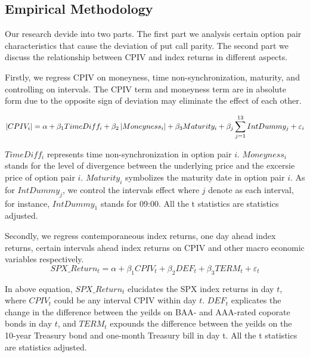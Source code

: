 \subsection{Empirical Methodology}
Our research devide into two parts. The first part we analysis certain option pair characteristics that cause the deviation of put call parity. The second part we discuss the relationship between CPIV and index returns in different aspects. 

Firstly, we regress CPIV on moneyness, time non-synchronization, maturity, and controlling on intervals. The CPIV term and moneyness term are in absolute form due to the opposite sign of deviation may eliminate the effect of each other. 

 \begin{equation}\label{eq:char}
 \footnotesize
\left | CPIV _{i} \right| = \alpha  + \beta _{1}TimeDiff_{i} + \beta _{2}\left |Moneyness_{i} \right | + \beta _{3}Maturity_{i} +  \beta _{j} \sum_{j=1}^{13}IntDummy_{j} +\varepsilon _{i}
 \end{equation}

$TimeDiff_{i}$ represents time non-synchronization in option pair $i$. $Moneyness_{i}$ stands for the level of divergence between the underlying price and the excersie price of option pair $i$. $Maturity_{i}$ symbolizes the maturity date in option pair $i$. As for $IntDummy_{j} $, we control the intervals effect where $j$ denote as each interval, for instance, $IntDummy_{1}$ stands for 09:00. All the t statistics are \citeauthor{newey1986simple} statistics adjusted. 

Secondly, we regress contemporaneous index returns, one day ahead index returns, certain intervals ahead index returns on CPIV and other macro economic variables respectively. 
 \begin{equation}  \label{eq:contem}
SPX\_Return_{t} = \alpha + \beta _{1}CPIV_{t} + \beta _{2}DEF_{t} + \beta _{3}TERM_{t} + \varepsilon _{t}
 \end{equation}

In above equation, $SPX\_Return_{t}$ elucidates the SPX index returns in day $t$, where $CPIV_{t}$ could be any interval CPIV within day $t$. $DEF_{t}$ explicates the change in the difference between the yeilds on BAA- and AAA-rated coporate bonds in day $t$, and $TERM_{t}$ expounds the difference between the yeilds on the 10-year Treasury bond and one-month Treasury bill in day t. All the t statistics are \citeauthor{newey1986simple} statistics adjusted. 

